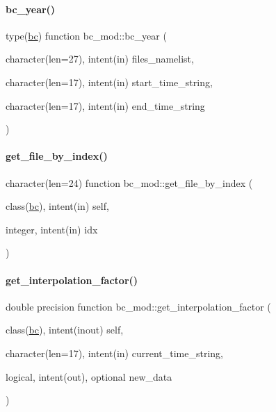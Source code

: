\paragraph{\texorpdfstring{bc\+\_\+year()}{bc\_year()}}
{\footnotesize\ttfamily type(\mbox{\hyperlink{structbc__mod_1_1bc}{bc}}) function bc\+\_\+mod\+::bc\+\_\+year (\begin{DoxyParamCaption}\item[{character(len=27), intent(in)}]{files\+\_\+namelist,  }\item[{character(len=17), intent(in)}]{start\+\_\+time\+\_\+string,  }\item[{character(len=17), intent(in)}]{end\+\_\+time\+\_\+string }\end{DoxyParamCaption})\hspace{0.3cm}{\ttfamily [private]}}

\mbox{\label{namespacebc__mod_a8a4134af9602c4532eb9698c4ab7f5a1}} 
\paragraph{\texorpdfstring{get\+\_\+file\+\_\+by\+\_\+index()}{get\_file\_by\_index()}}
{\footnotesize\ttfamily character(len=24) function bc\+\_\+mod\+::get\+\_\+file\+\_\+by\+\_\+index (\begin{DoxyParamCaption}\item[{class(\mbox{\hyperlink{structbc__mod_1_1bc}{bc}}), intent(in)}]{self,  }\item[{integer, intent(in)}]{idx }\end{DoxyParamCaption})\hspace{0.3cm}{\ttfamily [private]}}

\mbox{\label{namespacebc__mod_a94b8128bcc59330c1612f58d95bd6b33}} 
\paragraph{\texorpdfstring{get\+\_\+interpolation\+\_\+factor()}{get\_interpolation\_factor()}}
{\footnotesize\ttfamily double precision function bc\+\_\+mod\+::get\+\_\+interpolation\+\_\+factor (\begin{DoxyParamCaption}\item[{class(\mbox{\hyperlink{structbc__mod_1_1bc}{bc}}), intent(inout)}]{self,  }\item[{character(len=17), intent(in)}]{current\+\_\+time\+\_\+string,  }\item[{logical, intent(out), optional}]{new\+\_\+data }\end{DoxyParamCaption})\hspace{0.3cm}{\ttfamily [private]}}

